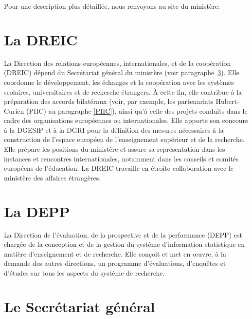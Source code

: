 Pour une description plus d\'etaill\'ee, nous renvoyons au site du minist\`ere: \\
{\small {}}

\section{La DREIC}\label{DREIC}
La Direction des relations europ\'eennes, internationales, et de la coop\'eration (DREIC) d\'epend du Secr\'etariat g\'en\'eral du minist\`ere (voir paragraphe~\ref{sgm}). Elle coordonne le d\'eveloppement, les \'echanges et la coop\'eration avec les syst\`emes scolaires, universitaires et de recherche \'etrangers. \`A cette fin, elle contribue \`a la pr\'eparation des accords bilat\'eraux (voir, par exemple, les partenariats Hubert-Curien (PHC) au paragraphe \ref{PHC}), ainsi qu'\`a celle des projets conduits dans le cadre des organisations europ\'eennes ou internationales. Elle apporte son concours \`a la DGESIP et \`a la DGRI pour la d\'efinition des mesures n\'ecessaires \`a la construction de l'espace europ\'een de l'enseignement sup\'erieur et de la recherche. Elle pr\'epare les positions du minist\`ere et assure sa repr\'esentation dans les instances et rencontres internationales, notamment dans les conseils et comit\'es europ\'eens de l'\'education.
La DREIC travaille en \'etroite collaboration avec le minist\`ere des affaires \'etrang\`eres.

{\small {}}

\section{La DEPP}
La Direction de l'\'evaluation, de la prospective et de la performance (DEPP) est charg\'ee de la conception et de la gestion du syst\`eme d'information statistique en mati\`ere d'enseignement et de recherche. Elle con\c coit et met en \oe uvre, \`a la demande des autres directions, un programme d'\'evaluations, d'enqu\^etes et d'\'etudes sur tous les aspects du syst\`eme de recherche.

{\small {}}

\section{Le Secr\'etariat g\'en\'eral} \label{sgm}

